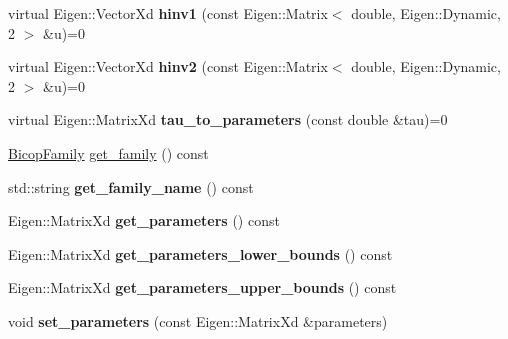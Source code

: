 \begin{DoxyCompactItemize}
\item 
virtual Eigen\+::\+Vector\+Xd {\bfseries hinv1} (const Eigen\+::\+Matrix$<$ double, Eigen\+::\+Dynamic, 2 $>$ \&u)=0\hypertarget{classvinecopulib_1_1_abstract_bicop_a4638c25e1dbb34288b65bcc9f1f6f04e}{}\label{classvinecopulib_1_1_abstract_bicop_a4638c25e1dbb34288b65bcc9f1f6f04e}

\item 
virtual Eigen\+::\+Vector\+Xd {\bfseries hinv2} (const Eigen\+::\+Matrix$<$ double, Eigen\+::\+Dynamic, 2 $>$ \&u)=0\hypertarget{classvinecopulib_1_1_abstract_bicop_a945d782285a9d11a59795e894e8c216b}{}\label{classvinecopulib_1_1_abstract_bicop_a945d782285a9d11a59795e894e8c216b}

\item 
virtual Eigen\+::\+Matrix\+Xd {\bfseries tau\+\_\+to\+\_\+parameters} (const double \&tau)=0\hypertarget{classvinecopulib_1_1_abstract_bicop_a48fc84b668c515745754bfe33ab7cbcf}{}\label{classvinecopulib_1_1_abstract_bicop_a48fc84b668c515745754bfe33ab7cbcf}

\end{DoxyCompactItemize}
{\bf }\par
\begin{DoxyCompactItemize}
\item 
\hyperlink{namespacevinecopulib_a42e95cc06d33896199caab0c11ad44f3}{Bicop\+Family} \hyperlink{classvinecopulib_1_1_abstract_bicop_a61878ff0664fa099f6f6ca4b7ad7833a}{get\+\_\+family} () const 
\item 
std\+::string {\bfseries get\+\_\+family\+\_\+name} () const \hypertarget{classvinecopulib_1_1_abstract_bicop_a294c3d6614fb1d42b4846599292f3197}{}\label{classvinecopulib_1_1_abstract_bicop_a294c3d6614fb1d42b4846599292f3197}

\item 
Eigen\+::\+Matrix\+Xd {\bfseries get\+\_\+parameters} () const \hypertarget{classvinecopulib_1_1_abstract_bicop_a5de117aa32e3e53ef787d517f965f1bc}{}\label{classvinecopulib_1_1_abstract_bicop_a5de117aa32e3e53ef787d517f965f1bc}

\item 
Eigen\+::\+Matrix\+Xd {\bfseries get\+\_\+parameters\+\_\+lower\+\_\+bounds} () const \hypertarget{classvinecopulib_1_1_abstract_bicop_ae7d234b7d647269f21b1904ab17d0a6b}{}\label{classvinecopulib_1_1_abstract_bicop_ae7d234b7d647269f21b1904ab17d0a6b}

\item 
Eigen\+::\+Matrix\+Xd {\bfseries get\+\_\+parameters\+\_\+upper\+\_\+bounds} () const \hypertarget{classvinecopulib_1_1_abstract_bicop_ac772d0c6e28b845a44a721568ac9bbe2}{}\label{classvinecopulib_1_1_abstract_bicop_ac772d0c6e28b845a44a721568ac9bbe2}

\item 
void {\bfseries set\+\_\+parameters} (const Eigen\+::\+Matrix\+Xd \&parameters)\hypertarget{classvinecopulib_1_1_abstract_bicop_a80596978ad8ec752a442f4a41dd0aedc}{}\label{classvinecopulib_1_1_abstract_bicop_a80596978ad8ec752a442f4a41dd0aedc}

\end{DoxyCompactItemize}

